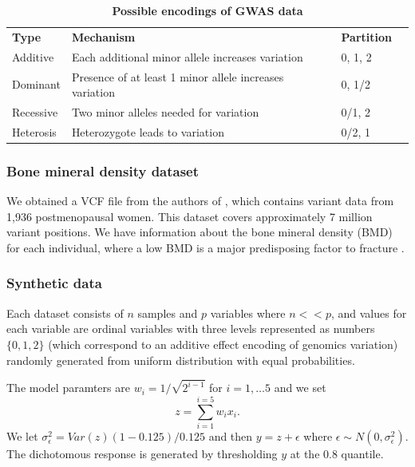 \documentclass[10pt,letterpaper]{article}
\newlength\savedwidth
\newcommand\thickhline{\noalign{\global\savedwidth\arrayrulewidth\global\arrayrulewidth 2pt}%
\hline
\noalign{\global\arrayrulewidth\savedwidth}}
\begin{document}
\begin{table}[!ht]
\begin{flushleft} 
\centering
\caption{\bf Possible encodings of GWAS data \cite{Goldstein.et.al.2011}}
\begin{tabular}{|l|l|l|l||}
\hline
{\bf Type} & {\bf Mechanism}                                         & {\bf Partition} \\ 
\thickhline
Additive   & Each additional minor allele increases variation        & 0, 1, 2         \\
Dominant   & Presence of at least 1 minor allele increases variation & 0, 1/2          \\
Recessive  & Two minor alleles needed for variation                  & 0/1, 2          \\
Heterosis  & Heterozygote leads to variation                         & 0/2, 1          \\ \hline
\end{tabular}
\label{table:encodings}
\end{flushleft}
\end{table}


\subsubsection{Bone mineral density dataset}
We obtained a VCF file from the authors of \cite{Duncan.2011}, which contains variant data from 1,936 postmenopausal women.
This dataset covers approximately 7 million variant positions. We have information about the bone mineral density (BMD)
for each individual, where a low BMD is a major predisposing factor to fracture \cite{Duncan.2011}. 

\subsubsection{Synthetic data} 
\label{section:synthetic_data}
 Each dataset consists of $n$ samples and $p$ variables where $n << p$,
and values for each variable are ordinal variables with three levels represented as numbers $\{0, 1, 2\}$ (which
correspond to an additive effect encoding of genomics variation) randomly generated from uniform distribution with equal
probabilities.  

The model paramters are $w_i = 1/\sqrt{2^{i-1}}$ for $i =1,\ldots 5$ and we set 
$$
z =  \sum_{i=1}^{i=5} {w_i x_i}.
$$
We let $\sigma_\epsilon^2 = Var(z)(1- 0.125)/0.125 $ and then 
$y =   z + \epsilon$ where $\epsilon \sim  N(0, \sigma_\epsilon^2).$
The dichotomous response is generated by thresholding $y$ at the $0.8$ quantile.
\end{document}
